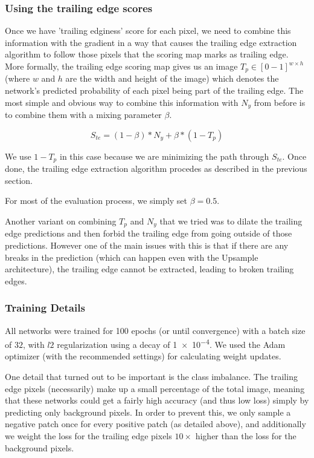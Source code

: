 
\subsubsection{Using the trailing edge scores}

Once we have 'trailing edginess' score for each pixel, we need to combine this information with the gradient in a way that causes the trailing edge extraction algorithm to follow those pixels that the scoring map marks as trailing edge.
More formally, the trailing edge scoring map gives us an image $T_p \in [0-1]^{w \times h}$ (where $w$ and $h$ are the width and height of the image) which denotes the network's predicted probability of each pixel being part of the trailing edge.
The most simple and obvious way to combine this information with $N_y$ from before is to combine them with a mixing parameter $\beta$.

\begin{equation}
S_{te} = (1 - \beta)*N_y + \beta*(1 - T_p)
\end{equation}

We use $1 - T_p$ in this case because we are minimizing the path through $S_{te}$.
Once done, the trailing edge extraction algorithm procedes as described in the previous section.

For most of the evaluation process, we simply set $\beta = 0.5$.

Another variant on combining $T_p$ and $N_y$ that we tried was to dilate the trailing edge predictions and then forbid the trailing edge from going outside of those predictions.
However one of the main issues with this is that if there are any breaks in the prediction (which can happen even with the Upsample architecture), the trailing edge cannot be extracted, leading to broken trailing edges.

\subsubsection{Training Details}

All networks were trained for 100 epochs (or until convergence) with a batch size of $32$, with $l2$ regularization using a decay of \num{1e-4}.
We used the Adam optimizer\cite{kingma2014adam} (with the recommended settings) for calculating weight updates.

One detail that turned out to be important is the class imbalance.
The trailing edge pixels (necessarily) make up a small percentage of the total image, meaning that these networks could get a fairly high accuracy (and thus low loss) simply by predicting only background pixels.
In order to prevent this, we only sample a negative patch once for every positive patch (as detailed above), and additionally we weight the loss for the trailing edge pixels $10\times$ higher than the loss for the background pixels.

